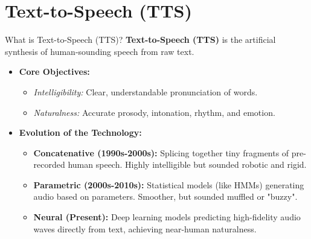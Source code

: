 \documentclass{beamer}
\begin{document}
\section{Text-to-Speech (TTS)}
\begin{frame}{What is Text-to-Speech (TTS)?}
  \textbf{Text-to-Speech (TTS)} is the artificial synthesis of human-sounding speech from raw text.
  \vspace{0.5cm}
  
  \begin{itemize}
      \setlength\itemsep{1em}
      \item \textbf{Core Objectives:} 
      \begin{itemize}
          \item \textit{Intelligibility:} Clear, understandable pronunciation of words.
          \item \textit{Naturalness:} Accurate prosody, intonation, rhythm, and emotion.
      \end{itemize}
      
      \item \textbf{Evolution of the Technology:}
      \begin{itemize}
          \item \textbf{Concatenative (1990s-2000s):} Splicing together tiny fragments of pre-recorded human speech. Highly intelligible but sounded robotic and rigid.
          \item \textbf{Parametric (2000s-2010s):} Statistical models (like HMMs) generating audio based on parameters. Smoother, but sounded muffled or "buzzy".
          \item \textbf{Neural (Present):} Deep learning models predicting high-fidelity audio waves directly from text, achieving near-human naturalness.
      \end{itemize}
  \end{itemize}
\end{frame}
\end{document}
